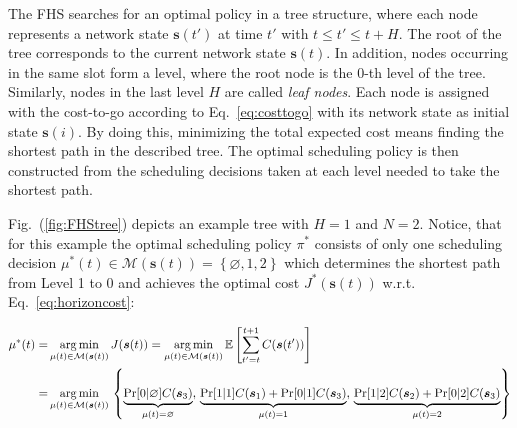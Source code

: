 The FHS searches for an optimal policy in a tree structure, where each node
represents a network state $\boldsymbol{s}(t')$ at time $t'$ with $t \leq t'
\leq t+H$. The root of the tree corresponds to the current network state
$\boldsymbol{s}(t)$. In addition, nodes occurring in the same slot form a level,
where the root node is the 0-th level of the tree. Similarly, nodes in the last
level $H$ are called \textit{leaf nodes}. Each node is assigned with the
cost-to-go according to Eq.~\eqref{eq:costtogo} with its network state as
initial state $\boldsymbol{s}(i)$. By doing this, minimizing the total expected
cost means finding the shortest path in the described tree. The optimal
scheduling policy is then constructed from the scheduling decisions taken at
each level needed to take the shortest path.

Fig.~(\ref{fig:FHStree}) depicts an example tree with $H=1$ and $N=2$. Notice,
that for this example the optimal scheduling policy $\pi^*$ consists of only one
scheduling decision $\mu^*(t) \in \mathcal{M}(\boldsymbol{s}(t)) = \left\{
\varnothing, 1, 2 \right\}$ which determines the shortest path from Level 1 to 0
and achieves the optimal cost $J^*(\boldsymbol{s}(t))$ w.r.t.
Eq.~\eqref{eq:horizoncost}:

\begin{align*}
    \mu^*(t) =& \operatorname*{arg\,min}_{\mu(t)\in\mathcal{M}(\boldsymbol{s}(t))}{J(\boldsymbol{s}(t))}
    = \operatorname*{arg\,min}_{\mu(t)\in\mathcal{M}(\boldsymbol{s}(t))}{\mathbb{E} \left[ \sum_{t' = t }^{t + 1} C(\boldsymbol{s}(t')) \right]} \\
    =& \operatorname*{arg\,min}_{\mu(t)\in\mathcal{M}(\boldsymbol{s}(t))}{} \left\{
      \underbrace{\Pr[0|\varnothing] C(\boldsymbol{s}_3)}_{\mu(t)=\varnothing}, \,
      \underbrace{\Pr[1|1] C(\boldsymbol{s}_1) + \Pr[0|1] C(\boldsymbol{s}_3)}_{\mu(t)=1}, \,
      \underbrace{\Pr[1|2] C(\boldsymbol{s}_2) + \Pr[0|2] C(\boldsymbol{s}_3)}_{\mu(t)=2} \right\}
\end{align*}



